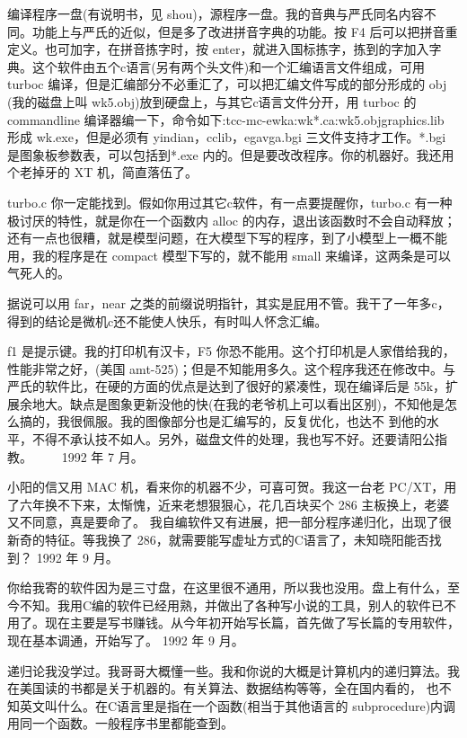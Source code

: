 编译程序一盘(有说明书，见 shou)，源程序一盘。我的音典与严氏同名内容不同。功能上与严氏的近似，但是多了改进拼音字典的功能。按 F4 后可以把拼音重定义。也可加字，在拼音拣字时，按 enter，就进入国标拣字，拣到的字加入字典。这个软件由五个c语言(另有两个头文件)和一个汇编语言文件组成，可用 turboc 编译，但是汇编部分不必重汇了，可以把汇编文件写成的部分形成的 obj (我的磁盘上叫 wk5.obj)放到硬盘上，与其它c语言文件分开，用 turboc 的 commandline 编译器编一下，命令如下:tcc-mc-ewka:wk*.ca:wk5.objgraphics.lib 形成 wk.exe，但是必须有 yindian，cclib，egavga.bgi 三文件支持才工作。*.bgi 是图象板参数表，可以包括到*.exe 内的。但是要改改程序。你的机器好。我还用个老掉牙的 XT 机，简直落伍了。

turbo.c 你一定能找到。假如你用过其它c软件，有一点要提醒你，turbo.c 有一种极讨厌的特性，就是你在一个函数内 alloc 的内存，退出该函数时不会自动释放；还有一点也很糟，就是模型问题，在大模型下写的程序，到了小模型上一概不能用，我的程序是在 compact 模型下写的，就不能用 small 来编译，这两条是可以气死人的。

据说可以用 far，near 之类的前缀说明指针，其实是屁用不管。我干了一年多c，得到的结论是微机c还不能使人快乐，有时叫人怀念汇编。

f1 是提示键。我的打印机有汉卡，F5 你恐不能用。这个打印机是人家借给我的，性能非常之好，(美国 amt-525)；但是不知能用多久。这个程序我还在修改中。与严氏的软件比，在硬的方面的优点是达到了很好的紧凑性，现在编译后是 55k，扩展余地大。缺点是图象更新没他的快(在我的老爷机上可以看出区别)，不知他是怎么搞的，我很佩服。我的图像部分也是汇编写的，反复优化，也达不 到他的水平，不得不承认技不如人。另外，磁盘文件的处理，我也写不好。还要请阳公指教。
　　1992 年 7 月。

小阳的信又用 MAC 机，看来你的机器不少，可喜可贺。我这一台老 PC/XT，用了六年换不下来，太惭愧，近来老想狠狠心，花几百块买个 286 主板换上，老婆又不同意，真是要命了。 我自编软件又有进展，把一部分程序递归化，出现了很新奇的特征。等我换了 286，就需要能写虚址方式的C语言了，未知晓阳能否找到？
1992 年 9 月。

你给我寄的软件因为是三寸盘，在这里很不通用，所以我也没用。盘上有什么，至今不知。我用C编的软件已经用熟，并做出了各种写小说的工具，别人的软件已不用了。现在主要是写书赚钱。从今年初开始写长篇，首先做了写长篇的专用软件，现在基本调通，开始写了。
1992 年 9 月。

递归论我没学过。我哥哥大概懂一些。我和你说的大概是计算机内的递归算法。我在美国读的书都是关于机器的。有关算法、数据结构等等，全在国内看的， 也不知英文叫什么。在C语言里是指在一个函数(相当于其他语言的 subprocedure)内调用同一个函数。一般程序书里都能查到。

